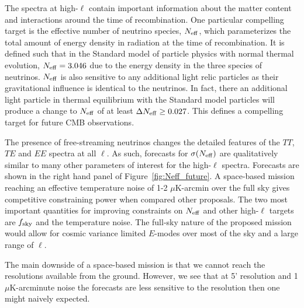The spectra at high-$\ell$ contain important information about the matter content and interactions around the time of recombination.  One particular compelling target is the effective number of neutrino species, ${N_{\rm eff}}$, which parameterizes the total amount of energy density in radiation at the time of recombination.  It is defined such that in the Standard model of particle physics with normal thermal evolution, ${N_{\rm eff}} = 3.046$ due to the energy density in the three species of neutrinos.  ${N_{\rm eff}}$ is also sensitive to any additional light relic particles as their gravitational influence is identical to the neutrinos.  In fact, there an additional light particle in thermal equilibrium with the Standard model particles will produce a change to ${N_{\rm eff}}$ of at least $\Delta {N_{\rm eff}} \geq 0.027$.  This defines a compelling target for future CMB observations.

The presence of free-streaming neutrinos changes the detailed features of the $TT$, $TE$ and $EE$ spectra at all $\ell$.  As such, forecasts for $\sigma({N_{\rm eff}})$ are qualitatively similar to many other parameters of interest for the high-$\ell$ spectra.  Forecasts are shown in the right hand panel of Figure~\ref{fig:Neff_future}.  A space-based mission reaching an effective temperature noise of 1-2 $\mu$K-arcmin over the full sky gives competitive constraining power when compared other proposals.  The two most important quantities for improving constraints on ${N_{\rm eff}}$ and other high-$\ell$ targets are $f_{\rm sky}$ and the temperature noise.  The full-sky nature of the proposed mission would allow for cosmic variance limited $E$-modes over most of the sky and a large range of $\ell$.

The main downside of a space-based mission is that we cannot reach the resolutions available from the ground.  However, we see that at 5' resolution and 1 $\mu$K-arcminute noise the forecasts are less sensitive to the resolution then one might naively expected.  


